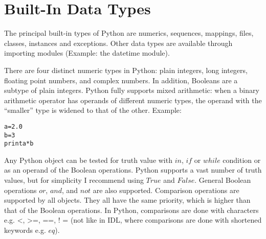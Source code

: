 \section{Built-In Data Types}
\label{s:dtype}
The principal built-in types of Python are numerics, sequences,
mappings, files, classes, instances and exceptions.  Other data types
are available through importing modules (Example: the datetime
module).

There are four distinct numeric types in Python: plain integers, long
integers, floating point numbers, and complex numbers.  In addition,
Booleans are a subtype of plain integers.  Python fully supports mixed
arithmetic: when a binary arithmetic operator has operands of
different numeric types, the operand with the ``smaller'' type is
widened to that of the other.  Example:
\begin{alltt}
\pytab a = 2.0
\pytab b = 3
\pytab print a * b
\end{alltt}

Any Python object can be tested for truth value with $in$, $if$ or
$while$ condition or as an operand of the Boolean operations.  Python
supports a vast number of truth values, but for simplicity I recommend
using $True$ and $False$.  General Boolean operations $or$, $and$, and
$not$ are also supported. Comparison operations are supported by all
objects.  They all have the same priority, which is higher than that
of the Boolean operations.  In Python, comparisons are done with
characters e.g. <, >=, ==, ! = (not like in IDL, where comparisons
are done with shortened keywords e.g. $eq$).

